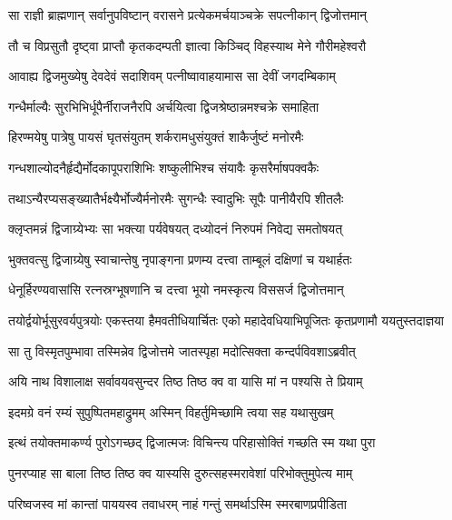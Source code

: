 \begin{center}
\twolineshloka
{सा राज्ञी ब्राह्मणान् सर्वानुपविष्टान् वरासने}
{प्रत्येकमर्चयाञ्चक्रे सपत्नीकान् द्विजोत्तमान्} %

\twolineshloka
{तौ च विप्रसुतौ दृष्ट्वा प्राप्तौ कृतकदम्पती}
{ज्ञात्वा किञ्चिद् विहस्याथ मेने गौरीमहेश्वरौ} %

\twolineshloka
{आवाह्य द्विजमुख्येषु देवदेवं सदाशिवम्}
{पत्नीष्वावाहयामास सा देवीं जगदम्बिकाम्} %

\twolineshloka
{गन्धैर्माल्यैः सुरभिभिर्धूपैर्नीराजनैरपि}
{अर्चयित्वा द्विजश्रेष्ठान्नमश्चक्रे समाहिता} %

\twolineshloka
{हिरण्मयेषु पात्रेषु पायसं घृतसंयुतम्}
{शर्करामधुसंयुक्तं शाकैर्जुष्टं मनोरमैः} %

\twolineshloka
{गन्धशाल्योदनैर्हृद्यैर्मोदकापूपराशिभिः}
{शष्कुलीभिश्च संयावैः कृसरैर्माषपक्वकैः} %

\twolineshloka
{तथाऽन्यैरप्यसङ्ख्यातैर्भक्ष्यैर्भोज्यैर्मनोरमैः}
{सुगन्धैः स्वादुभिः सूपैः पानीयैरपि शीतलैः} %

\twolineshloka
{क्लृप्तमन्नं द्विजाग्र्येभ्यः सा भक्त्या पर्यवेषयत्}
{दध्योदनं निरुपमं निवेद्य समतोषयत्} %

\twolineshloka
{भुक्तवत्सु द्विजाग्र्येषु स्वाचान्तेषु नृपाङ्गना}
{प्रणम्य दत्त्वा ताम्बूलं दक्षिणां च यथार्हतः} %

\twolineshloka
{धेनूर्हिरण्यवासांसि रत्नस्रग्भूषणानि च}
{दत्त्वा भूयो नमस्कृत्य विससर्ज द्विजोत्तमान्} %

\fourlineindentedshloka
{तयोर्द्वयोर्भूसुरवर्यपुत्रयोः}
{एकस्तया हैमवतीधियार्चितः}
{एको महादेवधियाभिपूजितः}
{कृतप्रणामौ ययतुस्तदाज्ञया} %

\twolineshloka
{सा तु विस्मृतपुम्भावा तस्मिन्नेव द्विजोत्तमे}
{जातस्पृहा मदोत्सिक्ता कन्दर्पविवशाऽब्रवीत्} %

\twolineshloka
{अयि\footnotemark{} नाथ विशालाक्ष सर्वावयवसुन्दर}
{तिष्ठ तिष्ठ क्व वा यासि मां न पश्यसि ते प्रियाम्} %

\twolineshloka
{इदमग्रे वनं रम्यं सुपुष्पितमहाद्रुमम्}
{अस्मिन् विहर्तुमिच्छामि त्वया सह यथासुखम्} %

\twolineshloka
{इत्थं तयोक्तमाकर्ण्य पुरोऽगच्छद् द्विजात्मजः}
{विचिन्त्य परिहासोक्तिं गच्छति स्म यथा पुरा} %

\twolineshloka
{पुनरप्याह सा बाला तिष्ठ तिष्ठ क्व यास्यसि}
{दुरुत्सहस्मरावेशां परिभोक्तुमुपेत्य माम्} %

\twolineshloka
{परिष्वजस्व मां कान्तां पाययस्व तवाधरम्}
{नाहं गन्तुं समर्थाऽस्मि स्मरबाणप्रपीडिता} %


\end{center}
